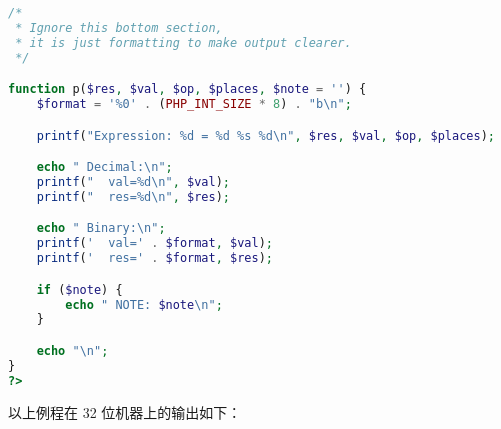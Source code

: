 \begin{lstlisting}[language=PHP]
/*
 * Ignore this bottom section,
 * it is just formatting to make output clearer.
 */

function p($res, $val, $op, $places, $note = '') {
    $format = '%0' . (PHP_INT_SIZE * 8) . "b\n";

    printf("Expression: %d = %d %s %d\n", $res, $val, $op, $places);

    echo " Decimal:\n";
    printf("  val=%d\n", $val);
    printf("  res=%d\n", $res);

    echo " Binary:\n";
    printf('  val=' . $format, $val);
    printf('  res=' . $format, $res);

    if ($note) {
        echo " NOTE: $note\n";
    }

    echo "\n";
}
?>
\end{lstlisting}



以上例程在 32 位机器上的输出如下：


